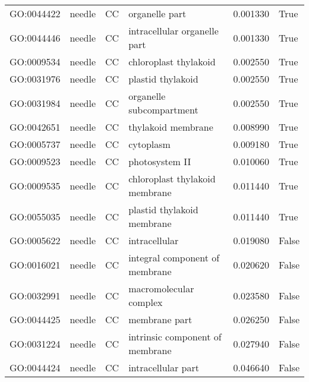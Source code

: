 \begin{longtable}{llllrl}
GO:0044422 & needle & CC &   organelle part  & 0.001330 &   True \\
GO:0044446 & needle & CC &   intracellular organelle part  & 0.001330 &   True \\
GO:0009534 & needle & CC &   chloroplast thylakoid  & 0.002550 &   True \\
GO:0031976 & needle & CC &   plastid thylakoid  & 0.002550 &   True \\
GO:0031984 & needle & CC &   organelle subcompartment  & 0.002550 &   True \\
GO:0042651 & needle & CC &   thylakoid membrane  & 0.008990 &   True \\
GO:0005737 & needle & CC &   cytoplasm  & 0.009180 &   True \\
GO:0009523 & needle & CC &   photosystem II  & 0.010060 &   True \\
GO:0009535 & needle & CC &   chloroplast thylakoid membrane  & 0.011440 &   True \\
GO:0055035 & needle & CC &   plastid thylakoid membrane  & 0.011440 &   True \\
GO:0005622 & needle & CC &   intracellular  & 0.019080 &   False \\
GO:0016021 & needle & CC &   integral component of membrane  & 0.020620 &   False \\
GO:0032991 & needle & CC &   macromolecular complex  & 0.023580 &   False \\
GO:0044425 & needle & CC &   membrane part  & 0.026250 &   False \\
GO:0031224 & needle & CC &   intrinsic component of membrane  & 0.027940 &   False \\
GO:0044424 & needle & CC &   intracellular part  & 0.046640 &   False \\
\bottomrule
\end{longtable}

